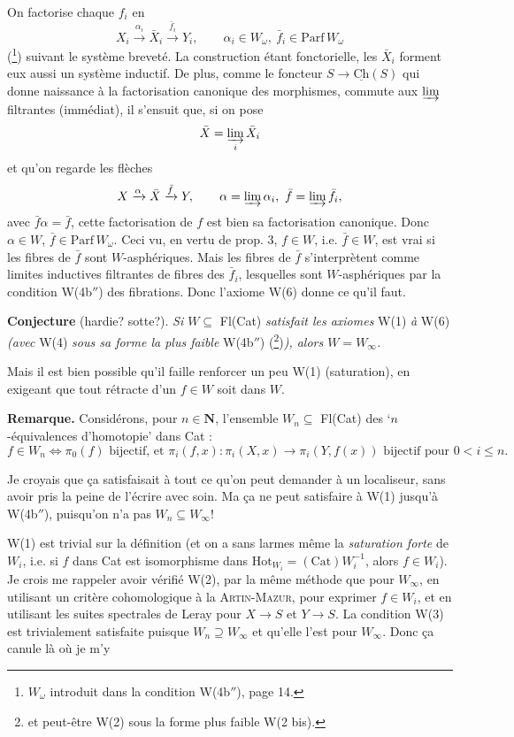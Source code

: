 \documentclass[11pt]{article}
\newcommand{\msp}[1]{\marginpar{\footnotesize [#1]}}
\newcommand{\Ch}{\underline{\mathrm{Ch}}}
\begin{document}
On factorise chaque $f_i$ en
\[ X_i \xrightarrow{\alpha_i} \bar{X}_i \xrightarrow{\bar{f}_i} Y_i, \qquad \alpha_i \in W_\omega,\ \bar{f}_i \in \mathrm{Parf}\, W_\omega \]
(\footnote[35]{$W_\omega$ introduit dans la condition W(4b$''$), page 14.}) suivant le système breveté. La construction étant fonctorielle, les $\bar{X}_i$ forment eux aussi un système inductif. De plus, comme le foncteur $S \longrightarrow \Ch(S)$ qui donne naissance à la factorisation canonique des morphismes, commute aux $\varinjlim$ filtrantes (immédiat), il s'ensuit que, si on pose
\[ \bar{X} = \varinjlim_{i} \bar{X}_i \]
et qu'on regarde les flèches
\[ X \xrightarrow{\alpha} \bar{X} \xrightarrow{\bar{f}} Y, \qquad \alpha = \varinjlim \alpha_i,\ \bar{f} = \varinjlim \bar{f}_i, \]
avec $\bar{f}\alpha = \bar{f}$, cette factorisation de $f$ est bien sa factorisation canonique. Donc $\alpha \in W$, %
$\bar{f} \in \mathrm{Parf}\, W_\omega$. Ceci vu, en vertu de prop. 3, $f \in W$, i.e. $\bar{f} \in W$, est vrai si les fibres de $\bar{f}$ sont $W$-asphériques. Mais les fibres de $\bar{f}$ s'interprètent comme limites inductives filtrantes de fibres des $\bar{f}_i$, lesquelles sont $W$-asphériques par la condition W(4b$''$) des fibrations. Donc l'axiome W(6) donne ce qu'il faut.

\textbf{Conjecture} (hardie? sotte?). \textit{Si $W \subseteq$} Fl(Cat) \textit{satisfait les axiomes} W(1) \textit{à} W(6) \textit{(avec} W(4) \textit{sous sa forme la plus faible} W(4b$''$) (\footnote[36]{et peut-être W(2) sous la forme plus faible W(2 bis).})\textit{), alors $W = W_\infty$.}

\msp{page 16}Mais il est bien possible qu'il faille renforcer un peu W(1) (saturation), en exigeant que tout rétracte d'un $f \in W$ soit dans $W$.

\textbf{Remarque.} Considérons, pour $n \in \mathbf{N}$, l'ensemble $W_n \subseteq$ Fl(Cat) des `$n$-équivalences d'homotopie' dans Cat :
\[ f \in W_n \iff \pi_0(f) \text{ bijectif, et } \pi_i(f, x) : \pi_i(X, x) \longrightarrow \pi_i(Y, f(x)) \text{ bijectif pour } 0 < i \leq n. \]

Je croyais que ça satisfaisait à tout ce qu'on peut demander à un localiseur, sans avoir pris la peine de l'écrire avec soin. Ma ça ne peut satisfaire à W(1) jusqu'à W(4b$''$), puisqu'on %
n'a pas $W_n \subseteq W_\infty$!

W(1) est trivial sur la définition (et on a sans larmes même la \textit{saturation forte} de $W_i$, %
i.e. si $f$ dans Cat est isomorphisme dans $\mathrm{Hot}_{W_i} = (\mathrm{Cat})W_i^{-1}$, alors $f \in W_i$). Je crois me rappeler avoir vérifié W(2), par la même méthode que pour $W_\infty$, en utilisant un critère cohomologique à la \textsc{Artin-Mazur}, pour exprimer $f \in W_i$, et en utilisant les suites spectrales de Leray pour $X \longrightarrow S$ et $Y \longrightarrow S$. La condition W(3) est trivialement satisfaite puisque $W_n \supseteq W_\infty$ et qu'elle l'est pour $W_\infty$. Donc ça canule là où je m'y
\end{document}

